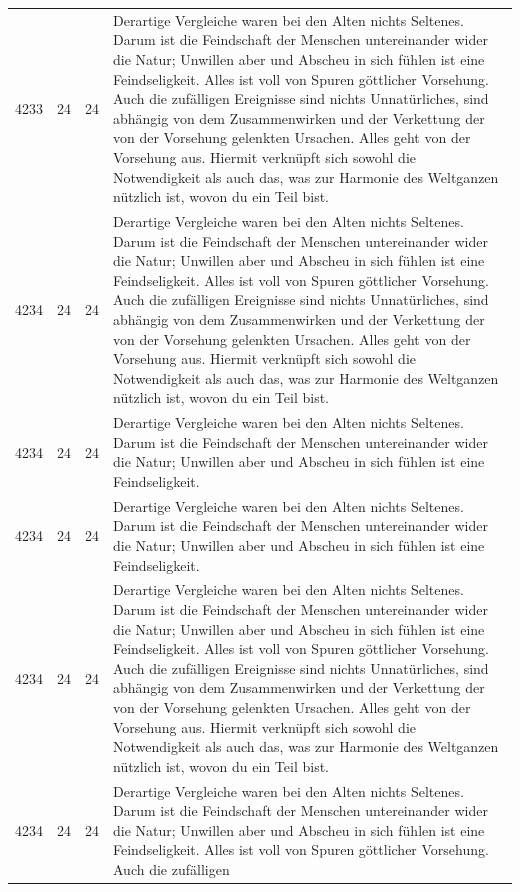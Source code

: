 \begin{landscape}

\begin{tabular}{lrcp{18cm}}
4233 & 24  & 24  & Derartige Vergleiche waren bei den Alten nichts Seltenes. Darum ist die Feindschaft der Menschen untereinander wider die Natur; Unwillen aber und Abscheu in sich fühlen ist eine Feindseligkeit. Alles ist voll von Spuren göttlicher Vorsehung. Auch die zufälligen Ereignisse sind nichts Unnatürliches, sind abhängig von dem Zusammenwirken und der Verkettung der von der Vorsehung gelenkten Ursachen. Alles geht von der Vorsehung aus. Hiermit verknüpft sich sowohl die Notwendigkeit als auch das, was zur Harmonie des Weltganzen nützlich ist, wovon du ein Teil bist.  \\
4234 & 24 & 24   & Derartige Vergleiche waren bei den Alten nichts Seltenes. Darum ist die Feindschaft der Menschen untereinander wider die Natur; Unwillen aber und Abscheu in sich fühlen ist eine Feindseligkeit.  Alles ist voll von Spuren göttlicher Vorsehung. Auch die zufälligen Ereignisse sind nichts Unnatürliches, sind abhängig von dem Zusammenwirken und der Verkettung der von der Vorsehung gelenkten Ursachen. Alles geht von der Vorsehung aus. Hiermit verknüpft sich sowohl die Notwendigkeit als auch das, was zur Harmonie des Weltganzen nützlich ist, wovon du ein Teil bist. \\
4234 & 24  & 24   & Derartige Vergleiche waren bei den Alten nichts Seltenes. Darum ist die Feindschaft der Menschen untereinander wider die Natur; Unwillen aber und Abscheu in sich fühlen ist eine Feindseligkeit. \\
4234 & 24  & 24   & Derartige Vergleiche waren bei den Alten nichts Seltenes. Darum ist die Feindschaft der Menschen untereinander wider die Natur; Unwillen aber und Abscheu in sich fühlen ist eine Feindseligkeit. \\
4234 & 24  & 24   & Derartige Vergleiche waren bei den Alten nichts Seltenes. Darum ist die Feindschaft der Menschen untereinander wider die Natur; Unwillen aber und Abscheu in sich fühlen ist eine Feindseligkeit. Alles ist voll von Spuren göttlicher Vorsehung. Auch die zufälligen Ereignisse sind nichts Unnatürliches, sind abhängig von dem Zusammenwirken und der Verkettung der von der Vorsehung gelenkten Ursachen. Alles geht von der Vorsehung aus. Hiermit verknüpft sich sowohl die Notwendigkeit als auch das, was zur Harmonie des Weltganzen nützlich ist, wovon du ein Teil bist.  \\
4234 & 24  & 24   & Derartige Vergleiche waren bei den Alten nichts Seltenes. Darum ist die Feindschaft der Menschen untereinander wider die Natur; Unwillen aber und Abscheu in sich fühlen ist eine Feindseligkeit. Alles ist voll von Spuren göttlicher Vorsehung. Auch die zufälligen \\ \end{tabular}

\end{landscape}

